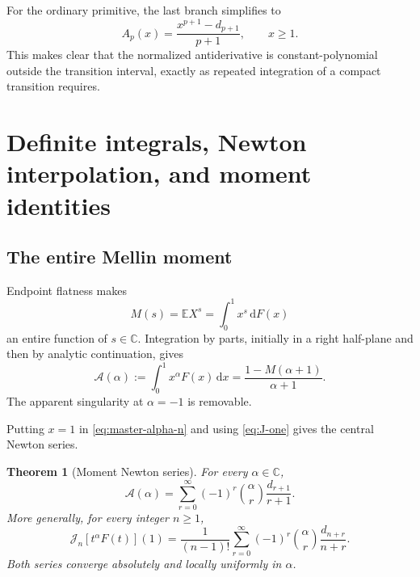 \documentclass[11pt,oneside]{article}
\newtheorem{theorem}{Theorem}[section]
\theoremstyle{definition}
\theoremstyle{remark}
\newcommand{\E}{\mathbb E}
\newcommand{\C}{\mathbb C}
\newcommand{\dd}{\,\mathrm d}
\newcommand{\Jn}{\mathcal J}
\newcommand{\1}{\mathbf 1}
\begin{document}
For the ordinary primitive, the last branch simplifies to
\begin{equation}
 A_p(x)=\frac{x^{p+1}-d_{p+1}}{p+1},\qquad x\geq1.              \label{eq:Ap-right}
\end{equation}
This makes clear that the normalized antiderivative is constant-polynomial
outside the transition interval, exactly as repeated integration of a compact
transition requires.

\section{Definite integrals, Newton interpolation, and moment identities}

\subsection{The entire Mellin moment}
Endpoint flatness makes
\begin{equation}
 M(s)=\E X^s=\int_0^1x^s\dd F(x)                               \label{eq:M-def}
\end{equation}
an entire function of \(s\in\C\).  Integration by parts, initially in a
right half-plane and then by analytic continuation, gives
\begin{equation}
 \boxed{\quad
 \mathcal A(\alpha):=\int_0^1x^\alpha F(x)\dd x
 =\frac{1-M(\alpha+1)}{\alpha+1}.
 \quad}                                                        \label{eq:A-M}
\end{equation}
The apparent singularity at \(\alpha=-1\) is removable.

Putting \(x=1\) in \eqref{eq:master-alpha-n} and using
\eqref{eq:J-one} gives the central Newton series.

\begin{theorem}[Moment Newton series]\label{thm:moment-newton}
For every \(\alpha\in\C\),
\begin{equation}
 \boxed{\quad
 \mathcal A(\alpha)
 =\sum_{r=0}^{\infty}(-1)^r\binom{\alpha}{r}
 \frac{d_{r+1}}{r+1}.
 \quad}                                                        \label{eq:moment-newton}
\end{equation}
More generally, for every integer \(n\geq1\),
\begin{equation}
 \boxed{\quad
 \Jn_n[t^\alpha F(t)](1)
 =\frac1{(n-1)!}\sum_{r=0}^{\infty}(-1)^r\binom{\alpha}{r}
 \frac{d_{n+r}}{n+r}.
 \quad}                                                        \label{eq:moment-newton-n}
\end{equation}
Both series converge absolutely and locally uniformly in \(\alpha\).
\end{theorem}
\end{document}
